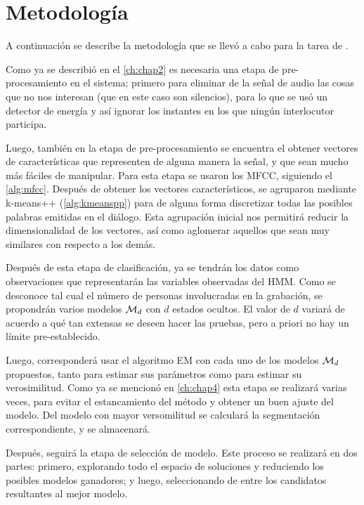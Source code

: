 
\chapter{Metodología}\label{ch:chap5}


A continuación se describe la metodología que se llevó a cabo para la tarea de \sd. 

Como ya se describió en el \autoref{ch:chap2} es necesaria una etapa de pre-procesamiento en el sistema; primero para eliminar de la señal de audio las cosas que no nos interesan (que en este caso son silencios), para lo que se usó un detector de energía y así ignorar los instantes en los que ningún interlocutor participa. 

Luego, también en la etapa de pre-procesamiento se encuentra el obtener vectores de características que representen de alguna manera la señal, y que sean mucho más fáciles de manipular. Para esta etapa se usaron los \ac{MFCC}, siguiendo el \autoref{alg:mfcc}.  Después de obtener los vectores característicos, se agruparon mediante k-means++ (\autoref{alg:kmeanspp}) para de alguna forma discretizar todas las posibles palabras emitidas en el diálogo. Esta agrupación inicial nos permitirá reducir la dimensionalidad de los vectores, así como aglomerar aquellos que sean muy similares con respecto a los demás.

Después de esta etapa de clasificación, ya se tendrán los datos como observaciones que representarán las variables observadas del \ac{HMM}. Como se desconoce tal cual el número de personas involucradas en la grabación, se propondrán varios modelos $\mathcal{M}_d$ con $d$ estados ocultos. El valor de $d$ variará de acuerdo a qué tan extensas se deseen hacer las pruebas, pero a priori no hay un límite pre-establecido. 

Luego, corresponderá usar el algoritmo \ac{EM} con cada uno de los modelos $\mathcal{M}_d$ propuestos, tanto para estimar sus parámetros como para estimar su verosimilitud. Como ya se mencionó en \autoref{ch:chap4} esta etapa se realizará varias veces, para evitar el estancamiento del método y obtener un buen ajuste del modelo. Del modelo con mayor versomilitud se calculará la segmentación correspondiente, y se almacenará. 

Después, seguirá la etapa de selección de modelo. Este proceso se realizará en dos partes: primero, explorando todo el espacio de soluciones y reduciendo los posibles modelos ganadores; y luego, seleccionando de entre los candidatos resultantes al mejor modelo.

